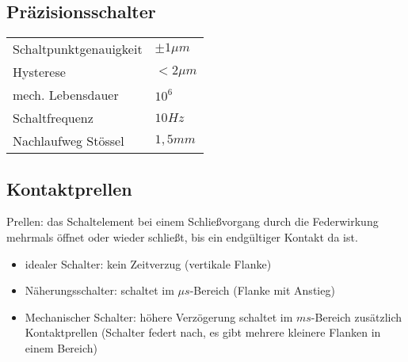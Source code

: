 \documentclass{scrreprt}
\begin{document}
\subsection{Präzisionsschalter}
\begin{tabular}{l l}
Schaltpunktgenauigkeit & $\pm 1 \unit{\mu m}$\\
Hysterese & $< 2 \unit{\mu m}$\\
mech. Lebensdauer & $10^6$\\
Schaltfrequenz & $10 \unit{Hz}$\\
Nachlaufweg Stössel & $1,5\unit{mm}$
\end{tabular}
\subsection{Kontaktprellen}
Prellen: das Schaltelement bei einem Schließvorgang durch die Federwirkung mehrmals öffnet oder wieder schließt, bis ein endgültiger Kontakt da ist.
\begin{itemize}
\item idealer Schalter: kein Zeitverzug (vertikale Flanke)
\item Näherungsschalter: schaltet im $\unit{\mu s}$-Bereich (Flanke mit Anstieg)
\item Mechanischer Schalter: höhere Verzögerung schaltet im $\unit{ms}$-Bereich zusätzlich Kontaktprellen (Schalter federt nach, es gibt mehrere kleinere Flanken in einem Bereich)
\end{itemize}
\end{document}
